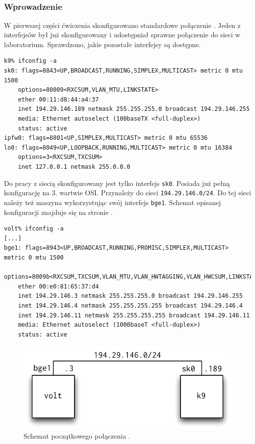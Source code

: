 \subsection{\eth}
\label{sec:eth}

\subsubsection{Wprowadzenie}

W pierwszej części ćwiczenia skonfigurowano standardowe połączenie \eth. Jeden z
interfejsów był już skonfigurowany i udostępniał sprawne połączenie do sieci w
laboratorium. Sprawdzono, jakie pozostałe interfejsy są dostępne.

\begin{lstlisting}
k9% ifconfig -a
sk0: flags=8843<UP,BROADCAST,RUNNING,SIMPLEX,MULTICAST> metric 0 mtu 1500
    options=80009<RXCSUM,VLAN_MTU,LINKSTATE>
    ether 00:11:d8:44:a4:37
    inet 194.29.146.189 netmask 255.255.255.0 broadcast 194.29.146.255
    media: Ethernet autoselect (100baseTX <full-duplex>)
    status: active
ipfw0: flags=8801<UP,SIMPLEX,MULTICAST> metric 0 mtu 65536
lo0: flags=8049<UP,LOOPBACK,RUNNING,MULTICAST> metric 0 mtu 16384
    options=3<RXCSUM,TXCSUM>
    inet 127.0.0.1 netmask 255.0.0.0
\end{lstlisting}

Do pracy z siecią skonfigurowany jest tylko interfejs \texttt{sk0}. Posiada już
pełną konfigurację na 3. wartwie OSI. Przynależy do sieci
\texttt{194.29.146.0/24}. Do tej sieci należy też maszyna \volt{} wykorzystując
swój interfejs \texttt{bge1}. Schemat opisanej konfiguracji znajduje się na
stronie \pageref{fig:eth:schemat-bez-konfiguracji}.

\begin{lstlisting}
volt% ifconfig -a
[...]
bge1: flags=8943<UP,BROADCAST,RUNNING,PROMISC,SIMPLEX,MULTICAST> metric 0 mtu 1500
    options=8009b<RXCSUM,TXCSUM,VLAN_MTU,VLAN_HWTAGGING,VLAN_HWCSUM,LINKSTATE>
    ether 00:e0:81:65:37:d4
    inet 194.29.146.3 netmask 255.255.255.0 broadcast 194.29.146.255
    inet 194.29.146.4 netmask 255.255.255.255 broadcast 194.29.146.4
    inet 194.29.146.11 netmask 255.255.255.255 broadcast 194.29.146.11
    media: Ethernet autoselect (1000baseT <full-duplex>)
    status: active
\end{lstlisting}

\begin{figure}[h!]
  \centering
  \includegraphics{figury/ethernet/schemat-bez-konfiguracji.pdf}
  \caption{Schemat początkowego połączenia \eth.}
  \label{fig:eth:schemat-bez-konfiguracji}
\end{figure}

